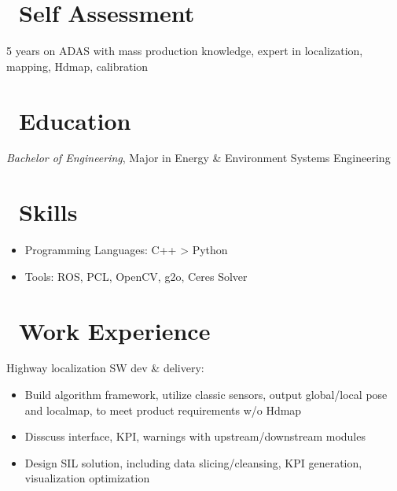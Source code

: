 \documentclass{resume}
\begin{document}



\section{\faGraduationCap\ Self Assessment}
5 years on ADAS with mass production knowledge, expert in localization, mapping, Hdmap, calibration

\section{\faGraduationCap\ Education}
\textit{Bachelor of Engineering}, Major in Energy \& Environment Systems Engineering

\section{\faCogs\ Skills}
\begin{itemize}[parsep=0.5ex]
  \item Programming Languages: C++ > Python
  \item Tools: ROS, PCL, OpenCV, g2o, Ceres Solver
\end{itemize}

\section{\faUsers\ Work Experience}
Highway localization SW dev \& delivery:
\begin{itemize}
  \item Build algorithm framework, utilize classic sensors, output global/local pose and localmap, to meet product requirements w/o Hdmap
  \item Disscuss interface, KPI, warnings with upstream/downstream modules
  \item Design SIL solution, including data slicing/cleansing, KPI generation, visualization optimization
\end{itemize}
\end{document}
